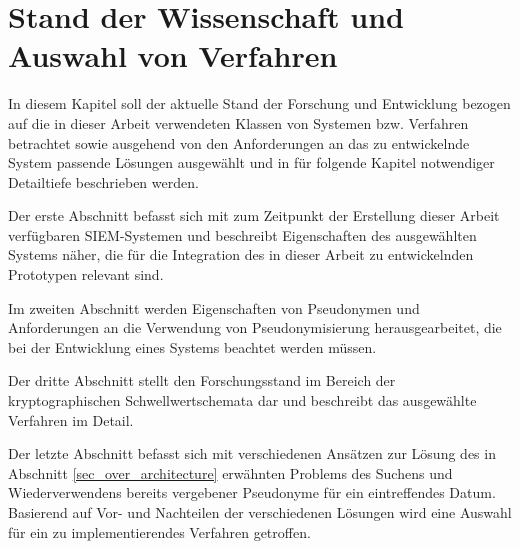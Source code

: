 \chapter{Stand der Wissenschaft und Auswahl von Verfahren}

\label{cha_state}

In diesem Kapitel soll der aktuelle Stand der Forschung und Entwicklung bezogen auf die in dieser Arbeit verwendeten Klassen von Systemen bzw. Verfahren betrachtet sowie ausgehend von den Anforderungen an das zu entwickelnde System passende Lösungen ausgewählt und in für folgende Kapitel notwendiger Detailtiefe beschrieben werden. 

Der erste Abschnitt befasst sich mit zum Zeitpunkt der Erstellung dieser Arbeit verfügbaren SIEM-Systemen und beschreibt Eigenschaften des ausgewählten Systems näher, die für die Integration des in dieser Arbeit zu entwickelnden Prototypen relevant sind.

Im zweiten Abschnitt werden Eigenschaften von Pseudonymen und Anforderungen an die Verwendung von Pseudonymisierung herausgearbeitet, die bei der Entwicklung eines Systems beachtet werden müssen.

Der dritte Abschnitt stellt den Forschungsstand im Bereich der kryptographischen Schwellwertschemata dar und beschreibt das ausgewählte Verfahren im Detail.

Der letzte Abschnitt befasst sich mit verschiedenen Ansätzen zur Lösung des in Abschnitt \ref{sec_over_architecture} erwähnten Problems des Suchens und Wiederverwendens bereits vergebener Pseudonyme für ein eintreffendes Datum. Basierend auf Vor- und Nachteilen der verschiedenen Lösungen wird eine Auswahl für ein zu implementierendes Verfahren getroffen.  







